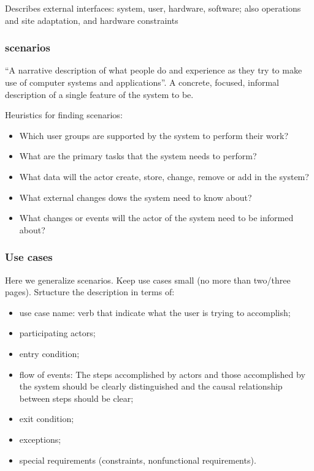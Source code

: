 Describes external interfaces: system, user, hardware, software; also operations and site adaptation, and hardware constraints

\subsubsection{scenarios}
\label{subsubsect:scenarios}

“A narrative description of what people do and experience as they try to make use of computer systems and applications”.
A concrete, focused, informal description of a single feature of the system to be.

Heuristics for finding scenarios:
\begin{itemize}
    \item Which user groups are supported by the system to perform their work?
    \item What are the primary tasks that the system needs to perform?
    \item What data will the actor create, store, change, remove or add in the system?
    \item What external changes dows the system need to know about?
    \item What changes or events will the actor of the system need to be informed about?
\end{itemize}

\subsubsection{Use cases}
\label{subsubsect:usecases}

Here we generalize scenarios. Keep use cases small (no more than two/three pages).
Srtucture the description in terms of:
\begin{itemize}
    \item use case name: verb that indicate what the user is trying     to accomplish;
    \item participating actors;
    \item entry condition;
    \item flow of events: The steps accomplished by actors and those accomplished by the system should be clearly distinguished and the causal relationship between steps should be clear;
    \item exit condition;
    \item exceptions;
    \item special requirements (constraints, nonfunctional requirements).
\end{itemize}

